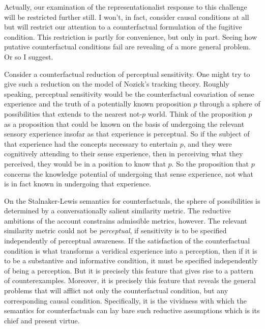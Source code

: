 \documentclass[12pt]{article}
\begin{document}
Actually, our examination of the representationalist response to this challenge will be restricted further still. I won't, in fact, consider causal conditions at all but will restrict our attention to a counterfactual formulation of the fugitive condition. This restriction is partly for convenience, but only in part. Seeing how putative counterfactual conditions fail are revealing of a more general problem. Or so I suggest.

Consider a counterfactual reduction of perceptual sensitivity. One might try to give such a reduction on the model of Nozick's \citeyearpar{Nozick:1981fk} tracking theory. Roughly speaking, perceptual sensitivity would be the counterfactual covariation of sense experience and the truth of a potentially known proposition \( p \) through a sphere of possibilities that extends to the nearest not-\( p \) world. Think of the proposition \( p \) as a proposition that could be known on the basis of undergoing the relevant sensory experience insofar as that experience is perceptual. So if the subject of that experience had the concepts necessary to entertain \( p \), and they were cognitively attending to their sense experience, then in perceiving what they perceived, they would be in a position to know that \( p \). So the proposition that \( p \) concerns the knowledge potential of undergoing that sense experience, not what is in fact known in undergoing that experience. 

On the Stalnaker-Lewis semantics for counterfactuals, the sphere of possibilities is determined by a conversationally salient similarity metric. The reductive ambitions of the account constrains admissible metrics, however. The relevant similarity metric could not be \emph{perceptual}, if sensitivity is to be specified independently of perceptual awareness. If the satisfaction of the counterfactual condition is what transforms a veridical experience into a perception, then if it is to be a substantive and informative condition, it must be specified independently of being a perception. But it is precisely this feature that gives rise to a pattern of counterexamples. Moreover, it is precisely this feature that reveals the general problems that will afflict not only the counterfactual condition, but any corresponding causal condition. Specifically, it is the vividness with which the semantics for counterfactuals can lay bare such reductive assumptions which is its chief and present virtue.
\end{document}

